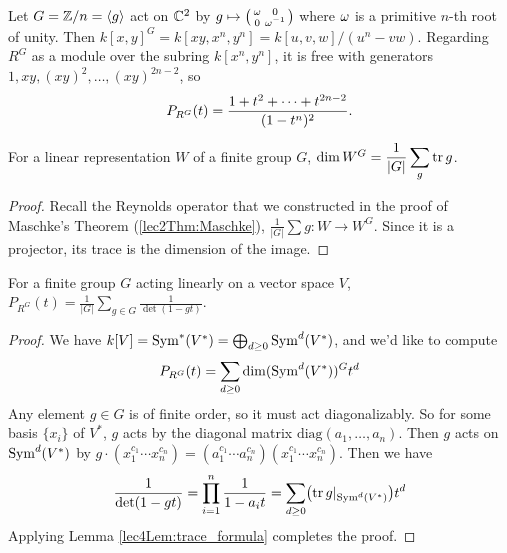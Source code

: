 
\begin{example}
 Let $G=\mathbb{Z}/n=\langle g\rangle$ act on $\mathbb{C}^2$ by $g\mapsto \bigl(\begin{smallmatrix} \omega&0\\ 0& \omega^{-1} \end{smallmatrix}\bigr)$ where $\omega$ is a primitive $n$-th root of unity. Then $k[x,y]^G=k[xy,x^n,y^n]=k[u,v,w]/(u^n-vw)$. Regarding $R^G$ as a module over the subring $k[x^n,y^n]$, it is free with generators $1, xy, (xy)^2,\dots, (xy)^{2n-2}$, so
 \[
  P_{R^G}(t)=\frac{1+t^2+\cdots +t^{2n-2}}{(1-t^n)^2}.\qedhere
 \]
\end{example}
\begin{lemma}\label{lec4Lem:trace_formula}
 For a linear representation $W$ of a finite group $G$, $\dim W^G = \displaystyle\frac{1}{|G|} \sum_g \operatorname{tr} g$.
\end{lemma}
\begin{proof}
 Recall the Reynolds operator that we constructed in the proof of Maschke's Theorem (\ref{lec2Thm:Maschke}), $\frac{1}{|G|} \sum g\colon W\to W^G$. Since it is a projector, its trace is the dimension of the image.
\end{proof}
\begin{proposition}\label{lec4Prop:Moilen}
 For a finite group $G$ acting linearly on a vector space $V$, $P_{R^G}(t) = \displaystyle\frac{1}{|G|}\sum_{g\in G} \frac{1}{\det(1-gt)}$.
\end{proposition}
\begin{proof}
 We have $k[V]=\operatorname{Sym}^*(V^*)=\bigoplus_{d\ge 0} \operatorname{Sym}^d(V^*)$, and we'd like to compute
 \[
  P_{R^G}(t) = \sum_{d\ge 0} \dim(\operatorname{Sym}^d(V^*))^G t^d
 \]
 Any element $g\in G$ is of finite order, so it must act diagonalizably. So for some basis $\{x_i\}$ of $V^*$, $g$ acts by the diagonal matrix $\mathrm{diag}(a_1,\dots, a_n)$. Then $g$ acts on $\operatorname{Sym}^d(V^*)$ by $g\cdot (x_1^{c_1}\cdots x_n^{c_n}) = (a_1^{c_1}\cdots a_n^{c_n})(x_1^{c_1}\cdots x_n^{c_n})$. Then we have
 \[
  \frac{1}{\det(1-gt)} = \prod_{i=1}^n \frac{1}{1-a_it} = \sum_{d\ge 0} \bigl(\operatorname{tr} g|_{\operatorname{Sym}^d(V^*)}\bigr)t^d
 \]
 Applying Lemma \ref{lec4Lem:trace_formula} completes the proof.
\end{proof}

% 
% 
% 
